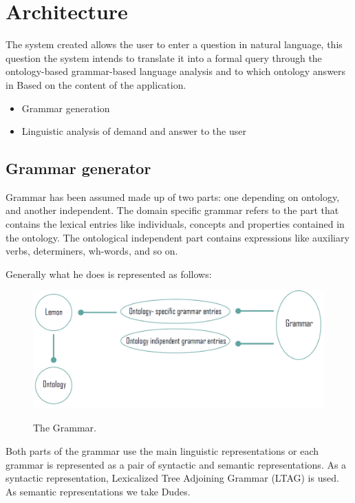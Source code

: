 \section{Architecture}
\label{sec:architecture}
The system created allows the user to enter a question in natural language, this question the system intends to translate it into a formal query through the ontology-based grammar-based language analysis and to which ontology answers in Based on the content of the application.
\begin{itemize}
	\item Grammar generation
	\item Linguistic analysis of demand and answer to the user
\end{itemize}

\subsection{Grammar generator}
Grammar has been assumed made up of two parts: one depending on ontology, and another independent. The domain specific grammar refers to the part that contains the lexical entries like individuals, concepts and properties contained in the ontology. The ontological independent part contains expressions like auxiliary verbs, determiners, wh-words, and so on.

Generally what he does is represented as follows:

\begin{figure}[H]
   \centering
    \includegraphics[scale=0.5]{./fig/grammar}
    \label{fig:grammar}
    \caption{The Grammar.}
\end{figure}

Both parts of the grammar use the main linguistic representations or each grammar is represented as a pair of syntactic and semantic representations. As a syntactic representation, Lexicalized Tree Adjoining Grammar (LTAG) is used. As semantic representations we take Dudes.

